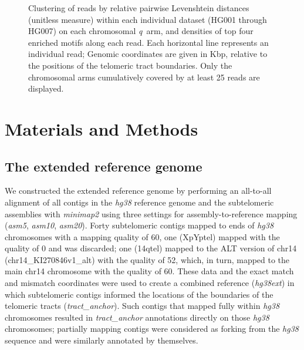 \documentclass{article}
\begin{document}
\begin{figure}[h!]
                \caption{ %
                    \small Clustering of reads by relative pairwise Levenshtein distances (unitless measure) %
                    within each individual dataset (HG001 through HG007) %
                    on each chromosomal \mbox{\textit{q} arm}, %
                    and densities of top four enriched motifs along each read. %
                    Each horizontal line represents an individual read; %
                    Genomic coordinates are given in Kbp, relative to the positions of the telomeric tract boundaries. %
                    Only the chromosomal arms cumulatively covered by at least 25 reads are displayed. %
                } %
                \label{fig:subject_haplotypes} %
                \end{figure} %

\section*{Materials and Methods}  \label{sec:methods}

\subsection*{The extended reference genome}
    We constructed the extended reference genome by performing an all-to-all alignment
        of all contigs in the \textit{hg38} reference genome \cite{grch38,hg38}
        and the subtelomeric assemblies \cite{riethman2014}
        with \textit{minimap2} \cite{minimap} using three settings
            for assembly-to-reference mapping (\textit{asm5}, \textit{asm10}, \textit{asm20}).
    Forty subtelomeric contigs mapped to ends of \textit{hg38} chromosomes with a mapping quality of 60,
        one (XpYptel) mapped with the quality of 0 and was discarded;
        one (14qtel) mapped to the ALT version of chr14 (chr14\_KI270846v1\_alt) with the quality of 52,
            which, in turn, mapped to the main chr14 chromosome with the quality of 60.
    These data and the exact match and mismatch coordinates were used to create a combined reference (\textit{hg38ext})
        in which subtelomeric contigs informed the locations of the boundaries of the telomeric tracts (\textit{tract\_anchor}).
    Such contigs that mapped fully within \textit{hg38} chromosomes resulted in \textit{tract\_anchor} annotations
            directly on those \textit{hg38} chromosomes;
        partially mapping contigs were considered as forking from the \textit{hg38} sequence and were similarly annotated by themselves.
\end{document}
